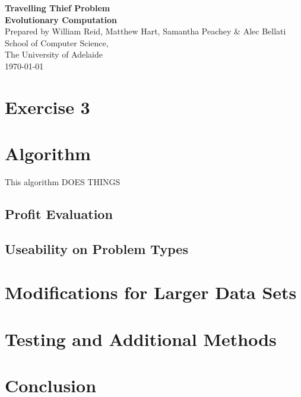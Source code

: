 \documentclass[a4paper, 12pt]{article}
\begin{document}
\begin{center}
{\LARGE\bf Travelling Thief Problem}\\
\vspace{0.5cm}
{\Large\bf Evolutionary Computation}\\
\vspace{1cm}
Prepared by William Reid, Matthew Hart, Samantha Peachey \& Alec Bellati\\
\vspace{1cm}
School of Computer Science,\\
The University of Adelaide\\
\vspace{1cm}
\today
\end{center}

\section*{Exercise 3}


\section{Algorithm}
This algorithm DOES THINGS


\newpage

\subsection{Profit Evaluation}


\subsection{Useability on Problem Types}


\newpage
\section{Modifications for Larger Data Sets}


\section{Testing and Additional Methods}


\newpage

\section{Conclusion}
\end{document}
